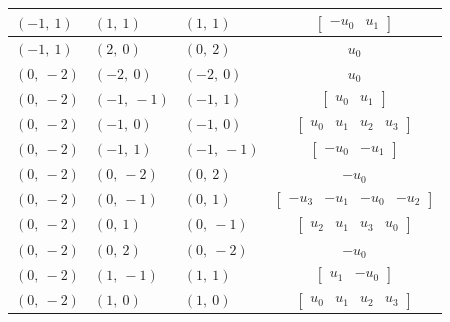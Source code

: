 \documentclass[11pt]{article}
\theoremstyle{definition}
\begin{document}
\begin{longtable}{|l|l|l|c|}
    \hline
    $\left( -1, \  1\right)$ & $\left( 1, \  1\right)$ & $\left( 1, \  1\right)$ & $\left[\begin{matrix}- u_{0} & u_{1}\end{matrix}\right]$ \\
    \hline
    $\left( -1, \  1\right)$ & $\left( 2, \  0\right)$ & $\left( 0, \  2\right)$ & $u_{0}$ \\
    \hline
    $\left( 0, \  -2\right)$ & $\left( -2, \  0\right)$ & $\left( -2, \  0\right)$ & $u_{0}$ \\
    \hline
    $\left( 0, \  -2\right)$ & $\left( -1, \  -1\right)$ & $\left( -1, \  1\right)$ & $\left[\begin{matrix}u_{0} & u_{1}\end{matrix}\right]$ \\
    \hline
    $\left( 0, \  -2\right)$ & $\left( -1, \  0\right)$ & $\left( -1, \  0\right)$ & $\left[\begin{matrix}u_{0} & u_{1} & u_{2} & u_{3}\end{matrix}\right]$ \\
    \hline
    $\left( 0, \  -2\right)$ & $\left( -1, \  1\right)$ & $\left( -1, \  -1\right)$ & $\left[\begin{matrix}- u_{0} & - u_{1}\end{matrix}\right]$ \\
    \hline
    $\left( 0, \  -2\right)$ & $\left( 0, \  -2\right)$ & $\left( 0, \  2\right)$ & $- u_{0}$ \\
    \hline
    $\left( 0, \  -2\right)$ & $\left( 0, \  -1\right)$ & $\left( 0, \  1\right)$ & $\left[\begin{matrix}- u_{3} & - u_{1} & - u_{0} & - u_{2}\end{matrix}\right]$ \\
    \hline
    $\left( 0, \  -2\right)$ & $\left( 0, \  1\right)$ & $\left( 0, \  -1\right)$ & $\left[\begin{matrix}u_{2} & u_{1} & u_{3} & u_{0}\end{matrix}\right]$ \\
    \hline
    $\left( 0, \  -2\right)$ & $\left( 0, \  2\right)$ & $\left( 0, \  -2\right)$ & $- u_{0}$ \\
    \hline
    $\left( 0, \  -2\right)$ & $\left( 1, \  -1\right)$ & $\left( 1, \  1\right)$ & $\left[\begin{matrix}u_{1} & - u_{0}\end{matrix}\right]$ \\
    \hline
    $\left( 0, \  -2\right)$ & $\left( 1, \  0\right)$ & $\left( 1, \  0\right)$ & $\left[\begin{matrix}u_{0} & u_{1} & u_{2} & u_{3}\end{matrix}\right]$ \\

\end{longtable}
\end{document}
